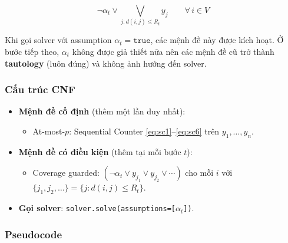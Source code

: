 \documentclass[11pt,a4paper]{article}
\begin{document}
\begin{equation}
    \neg \alpha_t \lor \bigvee_{j: d(i,j) \le R_t} y_j \qquad \forall\, i \in V
    \label{eq:guarded_coverage}
\end{equation}

Khi gọi solver với assumption $\alpha_t = \texttt{true}$, các mệnh đề này được kích hoạt.
Ở bước tiếp theo, $\alpha_t$ không được giả thiết nữa nên các mệnh đề cũ trở thành \textbf{tautology} (luôn đúng) và không ảnh hưởng đến solver.

\subsubsection{Cấu trúc CNF}

\begin{itemize}[nosep]
    \item \textbf{Mệnh đề cố định} (thêm một lần duy nhất):
    \begin{itemize}[nosep]
        \item At-most-$p$: Sequential Counter \eqref{eq:sc1}--\eqref{eq:sc6} trên $y_1, \dots, y_n$.
    \end{itemize}

    \item \textbf{Mệnh đề có điều kiện} (thêm tại mỗi bước $t$):
    \begin{itemize}[nosep]
        \item Coverage guarded: $(\neg \alpha_t \lor y_{j_1} \lor y_{j_2} \lor \cdots)$ cho mỗi $i$ với $\{j_1, j_2, \dots\} = \{j: d(i,j) \le R_t\}$.
    \end{itemize}

    \item \textbf{Gọi solver}: \texttt{solver.solve(assumptions=[$\alpha_t$])}.
\end{itemize}

\subsubsection{Pseudocode}
\end{document}

